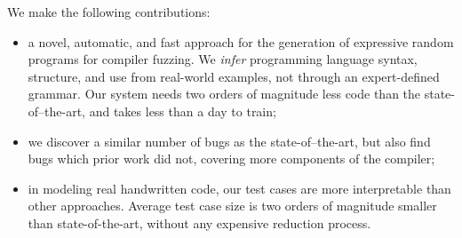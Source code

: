 %
%

We make the following contributions:
%
\begin{itemize}
\item a novel, automatic, and fast approach for the generation of expressive random programs for compiler fuzzing. We \emph{infer} programming language syntax, structure, and use from real-world examples, not through an expert-defined grammar. Our system needs two orders of magnitude less code than the state-of–the-art, and takes less than a day to train; %

\item we discover a similar number of bugs as the state-of–the-art, but also find bugs which prior work did not, covering more components of the compiler;

\item in modeling real handwritten code, our test cases are more interpretable than other approaches. Average test case size is two orders of magnitude smaller than state-of-the-art, without any expensive reduction process.
\end{itemize}

